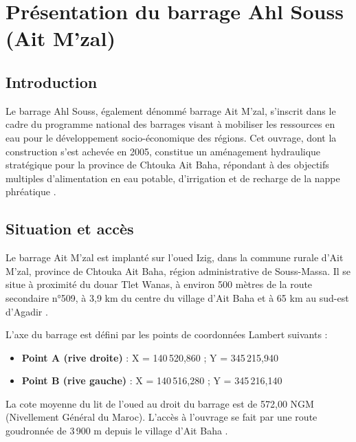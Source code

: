 \chapter{Présentation du barrage Ahl Souss (Ait M'zal)}
\label{chap:barrage}

\section{Introduction}
\label{sec:introduction_barrage}

Le barrage Ahl Souss, également dénommé barrage Ait M'zal, s'inscrit dans le cadre du programme national des barrages visant à mobiliser les ressources en eau pour le développement socio-économique des régions. Cet ouvrage, dont la construction s'est achevée en 2005, constitue un aménagement hydraulique stratégique pour la province de Chtouka Ait Baha, répondant à des objectifs multiples d'alimentation en eau potable, d'irrigation et de recharge de la nappe phréatique \cite{scet1994ahl, fiche_historique}.

\section{Situation et accès}
\label{sec:situation_acces}

Le barrage Ait M'zal est implanté sur l'oued Izig, dans la commune rurale d'Ait M'zal, province de Chtouka Ait Baha, région administrative de Souss-Massa. Il se situe à proximité du douar Tlet Wanas, à environ 500 mètres de la route secondaire n°509, à 3,9 km du centre du village d'Ait Baha et à 65 km au sud-est d'Agadir \cite{scet1994ahl, fiche_synoptique}.

L'axe du barrage est défini par les points de coordonnées Lambert suivants \cite{fiche_synoptique} :
\begin{itemize}
    \item \textbf{Point A (rive droite)} : X = 140\,520,860 ; Y = 345\,215,940
    \item \textbf{Point B (rive gauche)} : X = 140\,516,280 ; Y = 345\,216,140
\end{itemize}

La cote moyenne du lit de l'oued au droit du barrage est de 572,00 NGM (Nivellement Général du Maroc). L'accès à l'ouvrage se fait par une route goudronnée de 3\,900 m depuis le village d'Ait Baha \cite{fiche_synoptique}.

